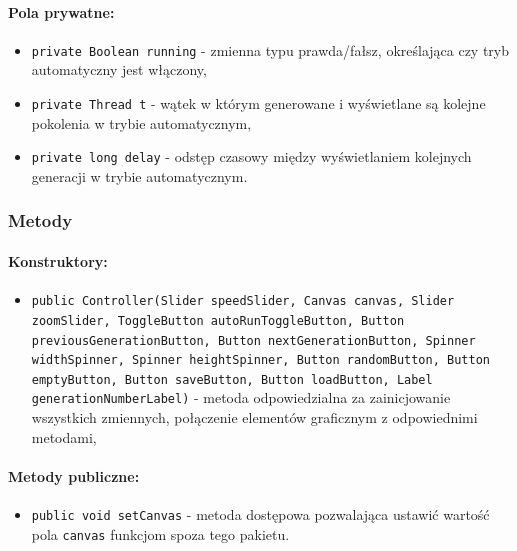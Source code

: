 \documentclass{report}
\begin{document}
\paragraph{Pola prywatne:}
\begin{itemize}
	\item \texttt{private Boolean running} - zmienna typu prawda/fałsz, określająca czy tryb automatyczny jest włączony,
	\item \texttt{private Thread t} - wątek w którym generowane i wyświetlane są kolejne pokolenia w trybie automatycznym\label{sec:thread},
	\item \texttt{private long delay} - odstęp czasowy między wyświetlaniem kolejnych generacji w trybie automatycznym.
\end{itemize}
\subsubsection{Metody}
\paragraph{Konstruktory:}
\begin{itemize}
 	\item \texttt{public Controller(Slider speedSlider, Canvas canvas, Slider zoomSlider, ToggleButton autoRunToggleButton, Button previousGenerationButton, Button nextGenerationButton, Spinner widthSpinner, Spinner heightSpinner, Button randomButton, Button emptyButton, Button saveButton, Button loadButton, Label generationNumberLabel)} - metoda odpowiedzialna za zainicjowanie wszystkich zmiennych, połączenie elementów graficznym z odpowiednimi metodami,
\end{itemize}
\paragraph{Metody publiczne:}
\begin{itemize}
 	\item \texttt{public void setCanvas} - metoda dostępowa pozwalająca ustawić wartość pola \texttt{canvas} funkcjom spoza tego pakietu.
\end{itemize}
\end{document}
